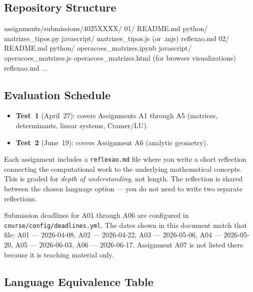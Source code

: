 \documentclass[a4paper,11pt]{article}
\begin{document}
\subsection{Repository Structure}

\begin{code}
assignments/submissions/4025XXXX/
  01/
    README.md
    python/
      matrizes_tipos.py
    javascript/
      matrizes_tipos.js (or .mjs)
    reflexao.md
  02/
    README.md
    python/
      operacoes_matrizes.ipynb
    javascript/
      operacoes_matrizes.js
      operacoes_matrizes.html   (for browser visualizations)
    reflexao.md
  ...
\end{code}

\subsection{Evaluation Schedule}

\begin{itemize}[leftmargin=*]
  \item \textbf{Test~1} (April~27): covers Assignments A1 through A5 (matrices, determinants, linear systems, Cramer/LU).
  \item \textbf{Test~2} (June~19): covers Assignment A6 (analytic geometry).
\end{itemize}

\begin{infobox}
  Each assignment includes a \texttt{reflexao.md} file where you write a short reflection connecting the computational work to the underlying mathematical concepts. This is graded for \emph{depth of understanding}, not length. The reflection is shared between the chosen language option --- you do not need to write two separate reflections.
\end{infobox}

\begin{infobox}
  Submission deadlines for A01 through A06 are configured in \texttt{course/config/deadlines.yml}. The dates shown in this document match that file: A01 --- 2026-04-08, A02 --- 2026-04-22, A03 --- 2026-05-06, A04 --- 2026-05-20, A05 --- 2026-06-03, A06 --- 2026-06-17. Assignment A07 is not listed there because it is teaching material only.
\end{infobox}

\subsection{Language Equivalence Table}
\end{document}
